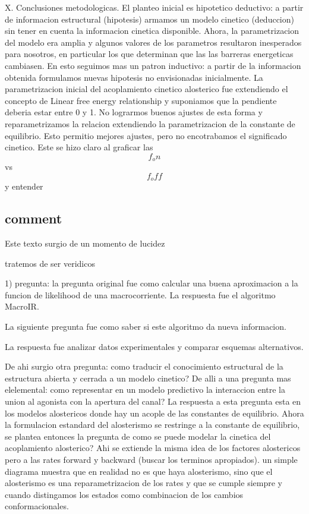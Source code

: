 \documentclass[a4paper,12pt]{article}
\begin{document}
		X. Conclusiones metodologicas. El planteo inicial es hipotetico deductivo: a partir de informacion estructural (hipotesis) armamos un modelo cinetico (deduccion)  sin tener en cuenta la informacion cinetica disponible. 
		Ahora, la parametrizacion del modelo era amplia y algunos valores de los parametros resultaron inesperados para nosotros, en particular los que determinan que las las barreras energeticas cambiasen. En esto seguimos mas un patron inductivo: a partir de la informacion obtenida formulamos nuevas hipotesis no envisionadas inicialmente. 
		La parametrizacion inicial del acoplamiento cinetico alosterico fue extendiendo el concepto de Linear free energy relationship y suponiamos que la pendiente deberia estar entre 0 y 1. No lograrmos buenos ajustes de esta forma y reparametrizamos la relacion extendiendo la parametrizacion de la constante de equilibrio. Esto permitio mejores ajustes, pero no encotrabamos el significado cinetico. Este se hizo claro al graficar las $$f_on$$ vs $$f_off$$ y entender   
	
	
	\subsection{comment}
		
		Este texto surgio de un momento de lucidez
		
		
		tratemos de ser veridicos
		
		1) pregunta: 
		la pregunta original fue como calcular una buena aproximacion a la funcion de likelihood de una macrocorriente. 
		La respuesta fue el algoritmo MacroIR. 
		
		La siguiente pregunta fue como saber si este algoritmo da nueva informacion. 
		
		La respuesta fue analizar datos experimentales y comparar esquemas alternativos. 
		
		De ahi surgio otra pregunta: como traducir el conocimiento estructural de la estructura abierta y cerrada a un modelo cinetico?
		De alli a una pregunta mas elelemental: como representar en un modelo predictivo la interaccion entre la union al agonista con la apertura del canal? 
		La respuesta a esta pregunta esta en los modelos alostericos donde hay un acople de las constantes de equilibrio. 
		Ahora la formulacion estandard del alosterismo se restringe a la constante de equilibrio, se plantea entonces la pregunta de como se puede modelar la cinetica del acoplamiento alosterico?
		Ahi se extiende la misma idea de los factores alostericos pero a las rates forward y backward (buscar los terminos apropiados). un simple diagrama muestra que en realidad no es que haya alosterismo, sino que el alosterismo es una reparametrizacion de los rates y que se cumple siempre y cuando distingamos los estados como combinacion de los cambios conformacionales. 
		
\end{document}
